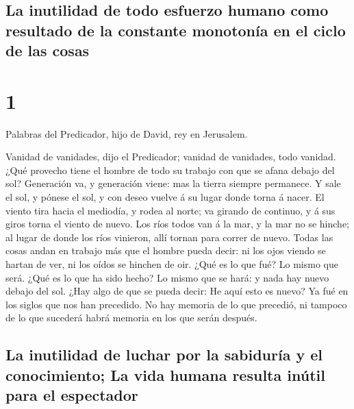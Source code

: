 \hypertarget{la-inutilidad-de-todo-esfuerzo-humano-como-resultado-de-la-constante-monotonuxeda-en-el-ciclo-de-las-cosas}{%
\subsection{La inutilidad de todo esfuerzo humano como resultado de la
constante monotonía en el ciclo de las
cosas}\label{la-inutilidad-de-todo-esfuerzo-humano-como-resultado-de-la-constante-monotonuxeda-en-el-ciclo-de-las-cosas}}

\hypertarget{section-21-1}{%
\section{1}\label{section-21-1}}

 Palabras del Predicador, hijo de David, rey en Jerusalem.

 Vanidad de vanidades, dijo el Predicador; vanidad de
vanidades, todo vanidad.  ¿Qué provecho tiene el hombre de
todo su trabajo con que se afana debajo del sol? 
Generación va, y generación viene: mas la tierra siempre permanece.
 Y sale el sol, y pónese el sol, y con deseo vuelve á su
lugar donde torna á nacer.  El viento tira hacia el
mediodía, y rodea al norte; va girando de continuo, y á sus giros torna
el viento de nuevo.  Los ríos todos van á la mar, y la mar
no se hinche; al lugar de donde los ríos vinieron, allí tornan para
correr de nuevo.  Todas las cosas andan en trabajo más que
el hombre pueda decir: ni los ojos viendo se hartan de ver, ni los oídos
se hinchen de oir.  ¿Qué es lo que fué? Lo mismo que será.
¿Qué es lo que ha sido hecho? Lo mismo que se hará: y nada hay nuevo
debajo del sol.  ¿Hay algo de que se pueda decir: He aquí
esto es nuevo? Ya fué en los siglos que nos han precedido.
 No hay memoria de lo que precedió, ni tampoco de lo que
sucederá habrá memoria en los que serán después.

\hypertarget{la-inutilidad-de-luchar-por-la-sabiduruxeda-y-el-conocimiento-la-vida-humana-resulta-inuxfatil-para-el-espectador}{%
\subsection{La inutilidad de luchar por la sabiduría y el conocimiento;
La vida humana resulta inútil para el
espectador}\label{la-inutilidad-de-luchar-por-la-sabiduruxeda-y-el-conocimiento-la-vida-humana-resulta-inuxfatil-para-el-espectador}}

